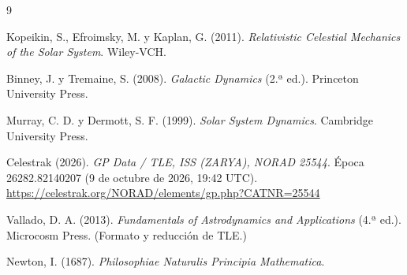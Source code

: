 \documentclass[11pt, a4paper]{article}
\begin{document}
\begin{thebibliography}{9}

Kopeikin, S., Efroimsky, M. y Kaplan, G. (2011). \textit{Relativistic Celestial Mechanics of the Solar System}. Wiley-VCH.

Binney, J. y Tremaine, S. (2008). \textit{Galactic Dynamics} (2.ª ed.). Princeton University Press.

Murray, C. D. y Dermott, S. F. (1999). \textit{Solar System Dynamics}. Cambridge University Press.

Celestrak (2026). \textit{GP Data / TLE, ISS (ZARYA), NORAD 25544}. Época 26282.82140207 (9 de octubre de 2026, 19:42 UTC). \url{https://celestrak.org/NORAD/elements/gp.php?CATNR=25544}

Vallado, D. A. (2013). \textit{Fundamentals of Astrodynamics and Applications} (4.ª ed.). Microcosm Press. (Formato y reducción de TLE.)

Newton, I. (1687). \textit{Philosophiae Naturalis Principia Mathematica}.

\end{thebibliography}
\end{document}
